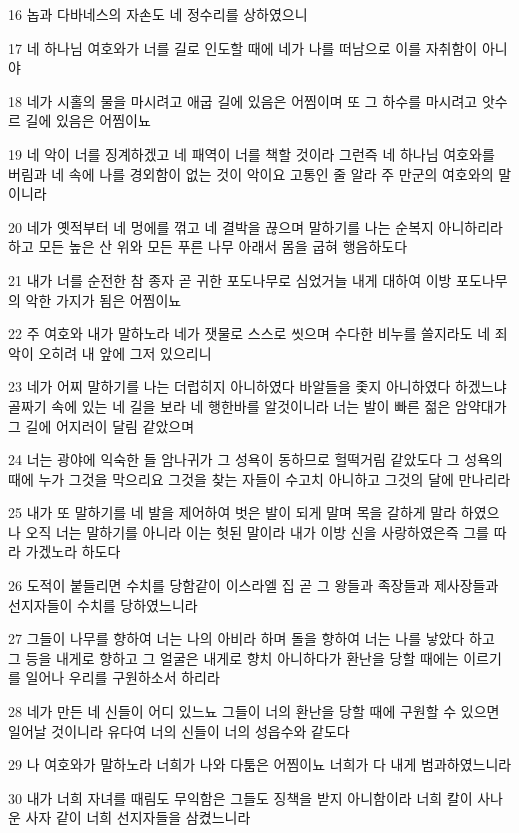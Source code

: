 \par 16 놉과 다바네스의 자손도 네 정수리를 상하였으니
\par 17 네 하나님 여호와가 너를 길로 인도할 때에 네가 나를 떠남으로 이를 자취함이 아니야
\par 18 네가 시홀의 물을 마시려고 애굽 길에 있음은 어찜이며 또 그 하수를 마시려고 앗수르 길에 있음은 어찜이뇨
\par 19 네 악이 너를 징계하겠고 네 패역이 너를 책할 것이라 그런즉 네 하나님 여호와를 버림과 네 속에 나를 경외함이 없는 것이 악이요 고통인 줄 알라 주 만군의 여호와의 말이니라
\par 20 네가 옛적부터 네 멍에를 꺾고 네 결박을 끊으며 말하기를 나는 순복지 아니하리라 하고 모든 높은 산 위와 모든 푸른 나무 아래서 몸을 굽혀 행음하도다
\par 21 내가 너를 순전한 참 종자 곧 귀한 포도나무로 심었거늘 내게 대하여 이방 포도나무의 악한 가지가 됨은 어찜이뇨
\par 22 주 여호와 내가 말하노라 네가 잿물로 스스로 씻으며 수다한 비누를 쓸지라도 네 죄악이 오히려 내 앞에 그저 있으리니
\par 23 네가 어찌 말하기를 나는 더럽히지 아니하였다 바알들을 좇지 아니하였다 하겠느냐 골짜기 속에 있는 네 길을 보라 네 행한바를 알것이니라 너는 발이 빠른 젊은 암약대가 그 길에 어지러이 달림 같았으며
\par 24 너는 광야에 익숙한 들 암나귀가 그 성욕이 동하므로 헐떡거림 같았도다 그 성욕의 때에 누가 그것을 막으리요 그것을 찾는 자들이 수고치 아니하고 그것의 달에 만나리라
\par 25 내가 또 말하기를 네 발을 제어하여 벗은 발이 되게 말며 목을 갈하게 말라 하였으나 오직 너는 말하기를 아니라 이는 헛된 말이라 내가 이방 신을 사랑하였은즉 그를 따라 가겠노라 하도다
\par 26 도적이 붙들리면 수치를 당함같이 이스라엘 집 곧 그 왕들과 족장들과 제사장들과 선지자들이 수치를 당하였느니라
\par 27 그들이 나무를 향하여 너는 나의 아비라 하며 돌을 향하여 너는 나를 낳았다 하고 그 등을 내게로 향하고 그 얼굴은 내게로 향치 아니하다가 환난을 당할 때에는 이르기를 일어나 우리를 구원하소서 하리라
\par 28 네가 만든 네 신들이 어디 있느뇨 그들이 너의 환난을 당할 때에 구원할 수 있으면 일어날 것이니라 유다여 너의 신들이 너의 성읍수와 같도다
\par 29 나 여호와가 말하노라 너희가 나와 다툼은 어찜이뇨 너희가 다 내게 범과하였느니라
\par 30 내가 너희 자녀를 때림도 무익함은 그들도 징책을 받지 아니함이라 너희 칼이 사나운 사자 같이 너희 선지자들을 삼켰느니라
